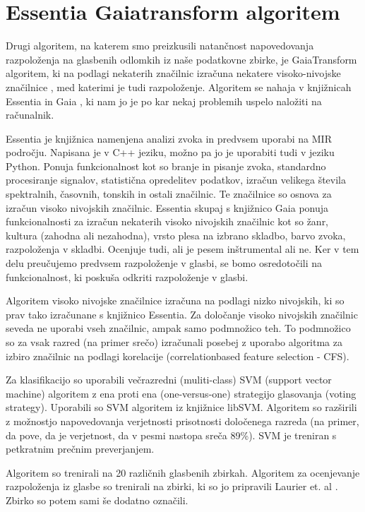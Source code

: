 \documentclass[a4paper, 12pt]{book}
\begin{document}
{\section{Essentia Gaiatransform algoritem}

Drugi algoritem, na katerem smo preizkusili natančnost napovedovanja razpoloženja na glasbenih odlomkih iz naše podatkovne zbirke, je GaiaTransform algoritem, ki na podlagi nekaterih značilnic izračuna nekatere visoko-nivojske značilnice \cite{bogdanov2013form}, med katerimi je tudi razpoloženje. Algoritem se nahaja v knjižnicah Essentia in Gaia \cite{bogdanov2013essentia}, ki nam jo je po kar nekaj problemih uspelo naložiti na računalnik. 

Essentia je knjižnica namenjena analizi zvoka in predvsem uporabi na MIR področju. Napisana je v C++ jeziku, možno pa jo je uporabiti tudi v jeziku Python. Ponuja funkcionalnost kot so branje in pisanje zvoka, standardno procesiranje signalov, statistična opredelitev podatkov, izračun velikega števila spektralnih, časovnih, tonskih in ostali značilnic. Te značilnice so osnova za izračun visoko nivojskih značilnic. Essentia skupaj s knjižnico Gaia ponuja funkcionalnosti za izračun nekaterih visoko nivojskih značilnic kot so žanr, kultura (zahodna ali nezahodna), vrsto plesa na izbrano skladbo, barvo zvoka, razpoloženja v skladbi. Ocenjuje tudi, ali je pesem inštrumental ali ne. Ker v tem delu preučujemo predvsem razpoloženje v glasbi, se bomo osredotočili na funkcionalnost, ki poskuša odkriti razpoloženje v glasbi.

Algoritem visoko nivojske značilnice izračuna na podlagi nizko nivojskih, ki so prav tako izračunane s knjižnico Essentia. Za določanje visoko nivojskih značilnic seveda ne uporabi vseh značilnic, ampak samo podmnožico teh. To podmnožico so za vsak razred (na primer srečo) izračunali posebej z uporabo algoritma za izbiro značilnic na podlagi korelacije (correlationbased feature selection - CFS). 

Za klasifikacijo so uporabili večrazredni (muliti-class) SVM (support vector machine) algoritem z ena proti ena (one-versus-one) strategijo glasovanja (voting strategy). Uporabili so SVM algoritem iz knjižnice libSVM. Algoritem so razširili z možnostjo napovedovanja verjetnosti prisotnosti določenega razreda (na primer, da pove, da je verjetnost, da v pesmi nastopa sreča 89\%). SVM je treniran s petkratnim prečnim preverjanjem.  

Algoritem so trenirali na 20 različnih glasbenih zbirkah. Algoritem za ocenjevanje razpoloženja iz glasbe so trenirali na zbirki, ki so jo pripravili Laurier et. al \cite{Laurier2009}. Zbirko so potem sami še dodatno označili. 

}
\end{document}
